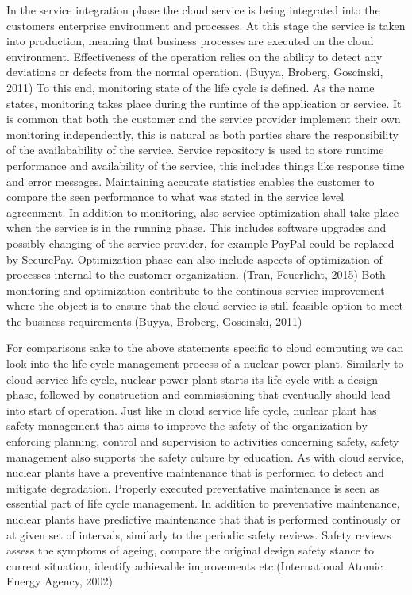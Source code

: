 \documentclass{article}
\begin{document}
In the service integration phase the cloud service is being integrated into the customers enterprise environment and processes. At this stage the service is taken into production, meaning that business processes are executed on the cloud environment. Effectiveness of the operation relies on the ability to detect any deviations or defects from the normal operation. (Buyya, Broberg, Goscinski, 2011) To this end, monitoring state of the life cycle is defined. As the name states, monitoring takes place during the runtime of the application or service. It is common that both the customer and the service provider implement their own monitoring independently, this is natural as both parties share the responsibility of the availabability of the service. Service repository is used to store runtime performance and availability of the service, this includes things like response time and error messages. Maintaining accurate statistics enables  the customer to compare the seen performance to what was stated in the service level agreenment. In addition to monitoring, also service optimization shall take place when the service is in the running phase. This includes software upgrades and possibly changing of the service provider, for example PayPal could be replaced by SecurePay. Optimization phase can also include aspects of optimization of processes internal to the customer organization. (Tran, Feuerlicht, 2015) Both monitoring and optimization contribute to the continous service improvement where the object is to ensure that the cloud service is still feasible option to meet the business requirements.(Buyya, Broberg, Goscinski, 2011)
\par
For comparisons sake to the above statements specific to cloud computing we can look into the life cycle management process of a nuclear power plant. Similarly to cloud service life cycle, nuclear power plant starts its life cycle with a design phase, followed by construction and commissioning that eventually should lead into start of operation. Just like in cloud service life cycle, nuclear plant has safety management that aims to improve the safety of the organization by enforcing planning, control and supervision to activities concerning safety, safety management also supports the safety culture by education. As with cloud service, nuclear plants have a preventive maintenance that is performed to detect and mitigate degradation. Properly executed preventative maintenance is seen as essential part of life cycle management. In addition to preventative maintenance, nuclear plants have predictive maintenance that that is performed continously or at given set of intervals, similarly to the periodic safety reviews. Safety reviews assess the symptoms of ageing, compare the original design safety stance to current situation, identify achievable improvements etc.(International Atomic Energy Agency, 2002) 
\end{document}
